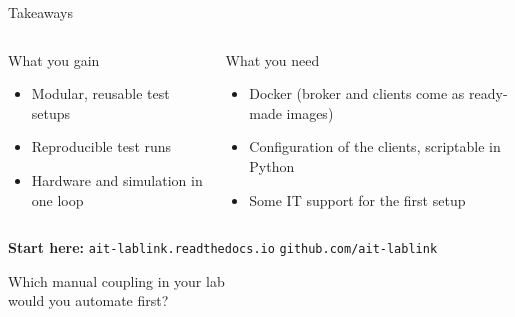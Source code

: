 \documentclass[aspectratio=169,11pt]{beamer}
\begin{document}
\begin{frame}{Takeaways}
  \begin{columns}[T]
    \begin{block}{What you gain}
      \begin{itemize}
        \item Modular, reusable test setups
        \item Reproducible test runs
        \item Hardware and simulation in one loop
      \end{itemize}
    \end{block}
    \begin{block}{What you need}
      \begin{itemize}
        \item Docker (broker and clients come as ready-made images)
        \item Configuration of the clients, scriptable in Python
        \item Some IT support for the first setup
      \end{itemize}
    \end{block}
  \end{columns}
  \vspace{0.6cm}
  \centering
  \textbf{Start here:} \texttt{ait-lablink.readthedocs.io} \quad \textbullet \quad \texttt{github.com/ait-lablink}
\end{frame}

\begin{frame}[standout]
  Which manual coupling in your lab\\
  would you automate first?
\end{frame}
\end{document}
